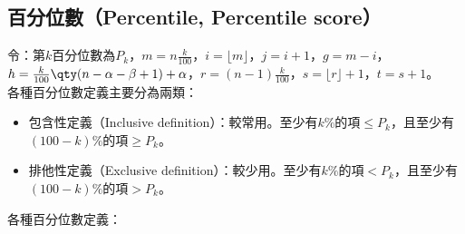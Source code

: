 \documentclass[a4paper,12pt]{report}
\begin{document}
\subsection{百分位數（Percentile, Percentile score）}
令：第$k$百分位數為$P_k$，$m=n\frac{k}{100}$，$i=\lfloor m\rfloor$，$j=i+1$，$g=m-i$，$h=\frac{k}{100}\qty(n-\alpha -\beta +1)+\alpha$，$r=(n-1)\frac{k}{100}$，$s=\lfloor r\rfloor+1$，$t=s+1$。\\
各種百分位數定義主要分為兩類：
\begin{itemize}
\item 包含性定義（Inclusive definition）：較常用。至少有$k$\%的項$\leq P_k$，且至少有$(100-k)\%$的項$\geq P_k$。
\item 排他性定義（Exclusive definition）：較少用。至少有$k\%$的項$<P_k$，且至少有$(100-k)\%$的項$>P_k$。
\end{itemize}
各種百分位數定義：
\end{document}
